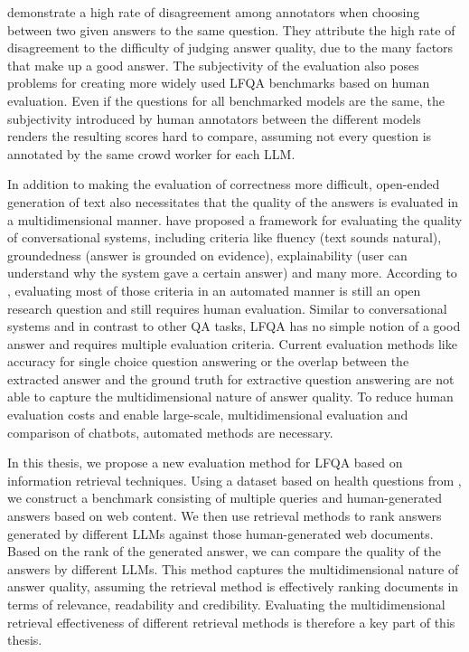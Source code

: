 \cite{krishna:2021:Hurdles} demonstrate a high rate of disagreement among annotators when choosing between two given answers to the same question.
They attribute the high rate of disagreement to the difficulty of judging answer quality, due to the many factors that make up a good answer.
The subjectivity of the evaluation also poses problems for creating more widely used LFQA benchmarks based on human evaluation.
Even if the questions for all benchmarked models are the same, the subjectivity introduced by human annotators between the different models renders the resulting scores hard to compare, assuming not every question is annotated by the same crowd worker for each LLM.

In addition to making the evaluation of correctness more difficult, open-ended generation of text also necessitates that the quality of the answers is evaluated in a multidimensional manner.
\cite{sakai:2023:swan} have proposed a framework for evaluating the quality of conversational systems, including criteria like fluency (text sounds natural), groundedness (answer is grounded on evidence), explainability (user can understand why the system gave a certain answer) and many more.
According to \cite{sakai:2023:swan}, evaluating most of those criteria in an automated manner is still an open research question and still requires human evaluation. 
Similar to conversational systems and in contrast to other QA tasks, LFQA has no simple notion of a good answer and requires multiple evaluation criteria.
Current evaluation methods like accuracy for single choice question answering or the overlap between the extracted answer and the ground truth for extractive question answering are not able to capture the multidimensional nature of answer quality.
To reduce human evaluation costs and enable large-scale, multidimensional evaluation and comparison of chatbots, automated methods are necessary.

In this thesis, we propose a new evaluation method for LFQA based on information retrieval techniques.
Using a dataset based on health questions from \cite{goeuriot:2021:Consumer}, we construct a benchmark consisting of multiple queries and human-generated answers based on web content.
We then use retrieval methods to rank answers generated by different LLMs against those human-generated web documents.
Based on the rank of the generated answer, we can compare the quality of the answers by different LLMs.
This method captures the multidimensional nature of answer quality, assuming the retrieval method is effectively ranking documents in terms of relevance, readability and credibility.
Evaluating the multidimensional retrieval effectiveness of different retrieval methods is therefore a key part of this thesis.

